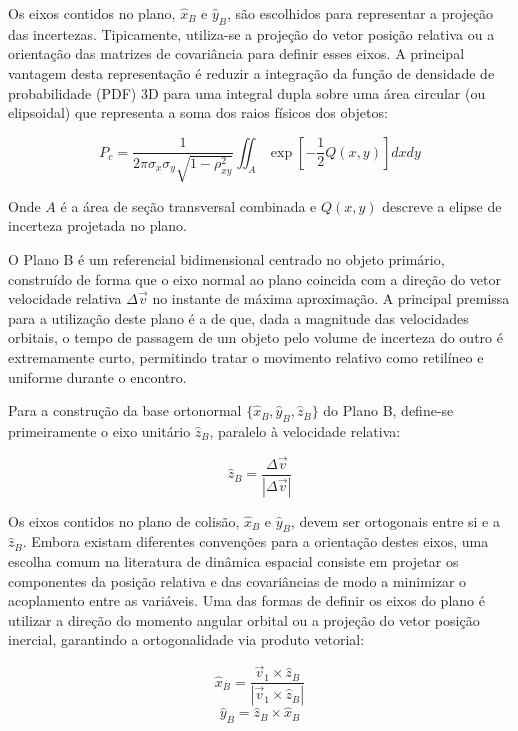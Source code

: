 Os eixos contidos no plano, $\hat{x}_B$ e $\hat{y}_B$, são escolhidos para representar a projeção das incertezas. Tipicamente, utiliza-se a projeção do vetor posição relativa ou a orientação das matrizes de covariância para definir esses eixos. A principal vantagem desta representação é reduzir a integração da função de densidade de probabilidade (PDF) 3D para uma integral dupla sobre uma área circular (ou elipsoidal) que representa a soma dos raios físicos dos objetos:

\begin{equation}
    P_c = \frac{1}{2\pi \sigma_x \sigma_y \sqrt{1-\rho_{xy}^2}} \iint_{A} \exp \left[ -\frac{1}{2} Q(x,y) \right] dx dy
\end{equation}

Onde $A$ é a área de seção transversal combinada e $Q(x,y)$ descreve a elipse de incerteza projetada no plano.

O Plano B é um referencial bidimensional centrado no objeto primário, construído de forma que o eixo normal ao plano coincida com a direção do vetor velocidade relativa $\Delta \vec{v}$ no instante de máxima aproximação. A principal premissa para a utilização deste plano é a de que, dada a magnitude das velocidades orbitais, o tempo de passagem de um objeto pelo volume de incerteza do outro é extremamente curto, permitindo tratar o movimento relativo como retilíneo e uniforme durante o encontro.



Para a construção da base ortonormal $\{\hat{x}_B, \hat{y}_B, \hat{z}_B\}$ do Plano B, define-se primeiramente o eixo unitário $\hat{z}_B$, paralelo à velocidade relativa:

\begin{equation}
    \hat{z}_B = \frac{\Delta \vec{v}}{|\Delta \vec{v}|}
\end{equation}

Os eixos contidos no plano de colisão, $\hat{x}_B$ e $\hat{y}_B$, devem ser ortogonais entre si e a $\hat{z}_B$. Embora existam diferentes convenções para a orientação destes eixos, uma escolha comum na literatura de dinâmica espacial consiste em projetar os componentes da posição relativa e das covariâncias de modo a minimizar o acoplamento entre as variáveis. Uma das formas de definir os eixos do plano é utilizar a direção do momento angular orbital ou a projeção do vetor posição inercial, garantindo a ortogonalidade via produto vetorial:

\begin{equation}
    \hat{x}_B = \frac{\vec{v}_1 \times \hat{z}_B}{|\vec{v}_1 \times \hat{z}_B|}
\end{equation}
\begin{equation}
    \hat{y}_B = \hat{z}_B \times \hat{x}_B
\end{equation}

